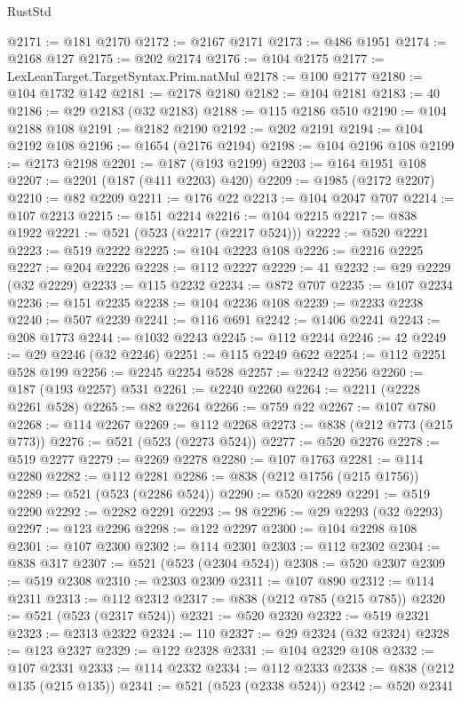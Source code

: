 \begin{lexlean}{RustStd}
\begin{coremodule}
@2171 := @181 @2170
@2172 := @2167 @2171
@2173 := @486 @1951
@2174 := @2168 @127
@2175 := @202 @2174
@2176 := @104 @2175
@2177 := LexLeanTarget.TargetSyntax.Prim.natMul
@2178 := @100 @2177
@2180 := @104 @1732 @142
@2181 := @2178 @2180
@2182 := @104 @2181
@2183 := 40
@2186 := @29 @2183 (@32 @2183)
@2188 := @115 @2186 @510
@2190 := @104 @2188 @108
@2191 := @2182 @2190
@2192 := @202 @2191
@2194 := @104 @2192 @108
@2196 := @1654 (@2176 @2194)
@2198 := @104 @2196 @108
@2199 := @2173 @2198
@2201 := @187 (@193 @2199)
@2203 := @164 @1951 @108
@2207 := @2201 (@187 (@411 @2203) @420)
@2209 := @1985 (@2172 @2207)
@2210 := @82 @2209
@2211 := @176 @22
@2213 := @104 @2047 @707
@2214 := @107 @2213
@2215 := @151 @2214
@2216 := @104 @2215
@2217 := @838 @1922
@2221 := @521 (@523 (@2217 (@2217 @524)))
@2222 := @520 @2221
@2223 := @519 @2222
@2225 := @104 @2223 @108
@2226 := @2216 @2225
@2227 := @204 @2226
@2228 := @112 @2227
@2229 := 41
@2232 := @29 @2229 (@32 @2229)
@2233 := @115 @2232
@2234 := @872 @707
@2235 := @107 @2234
@2236 := @151 @2235
@2238 := @104 @2236 @108
@2239 := @2233 @2238
@2240 := @507 @2239
@2241 := @116 @691
@2242 := @1406 @2241
@2243 := @208 @1773
@2244 := @1032 @2243
@2245 := @112 @2244
@2246 := 42
@2249 := @29 @2246 (@32 @2246)
@2251 := @115 @2249 @622
@2254 := @112 @2251 @528 @199
@2256 := @2245 @2254 @528
@2257 := @2242 @2256
@2260 := @187 (@193 @2257) @531
@2261 := @2240 @2260
@2264 := @2211 (@2228 @2261 @528)
@2265 := @82 @2264
@2266 := @759 @22
@2267 := @107 @780
@2268 := @114 @2267
@2269 := @112 @2268
@2273 := @838 (@212 @773 (@215 @773))
@2276 := @521 (@523 (@2273 @524))
@2277 := @520 @2276
@2278 := @519 @2277
@2279 := @2269 @2278
@2280 := @107 @1763
@2281 := @114 @2280
@2282 := @112 @2281
@2286 := @838 (@212 @1756 (@215 @1756))
@2289 := @521 (@523 (@2286 @524))
@2290 := @520 @2289
@2291 := @519 @2290
@2292 := @2282 @2291
@2293 := 98
@2296 := @29 @2293 (@32 @2293)
@2297 := @123 @2296
@2298 := @122 @2297
@2300 := @104 @2298 @108
@2301 := @107 @2300
@2302 := @114 @2301
@2303 := @112 @2302
@2304 := @838 @317
@2307 := @521 (@523 (@2304 @524))
@2308 := @520 @2307
@2309 := @519 @2308
@2310 := @2303 @2309
@2311 := @107 @890
@2312 := @114 @2311
@2313 := @112 @2312
@2317 := @838 (@212 @785 (@215 @785))
@2320 := @521 (@523 (@2317 @524))
@2321 := @520 @2320
@2322 := @519 @2321
@2323 := @2313 @2322
@2324 := 110
@2327 := @29 @2324 (@32 @2324)
@2328 := @123 @2327
@2329 := @122 @2328
@2331 := @104 @2329 @108
@2332 := @107 @2331
@2333 := @114 @2332
@2334 := @112 @2333
@2338 := @838 (@212 @135 (@215 @135))
@2341 := @521 (@523 (@2338 @524))
@2342 := @520 @2341

\end{coremodule}
\end{lexlean}
